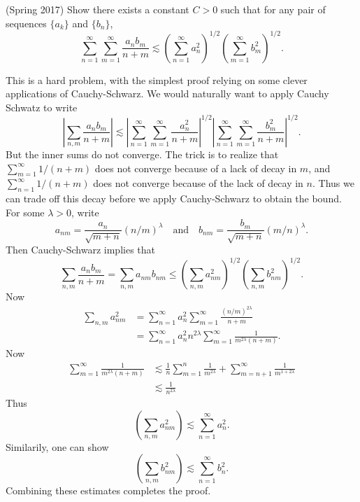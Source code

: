 \documentclass[answers]{exam}
\begin{document}
\begin{questions}
\question (Spring 2017) Show there exists a constant $C > 0$ such that for any pair of sequences $\{ a_k \}$ and $\{ b_n \}$,
%
\[ \sum_{n = 1}^\infty \sum_{m = 1}^\infty \frac{a_n b_m}{n + m} \lesssim \left( \sum_{n = 1}^\infty a_n^2 \right)^{1/2} \left( \sum_{m = 1}^\infty b_m^2 \right)^{1/2}. \]
\begin{solution}
	This is a hard problem, with the simplest proof relying on some clever applications of Cauchy-Schwarz. We would naturally want to apply Cauchy Schwatz to write
	\[ \left| \sum_{n,m} \frac{a_n b_m}{n + m} \right| \lesssim \left| \sum_{n = 1}^\infty \sum_{m = 1}^\infty \frac{a_n^2}{n + m} \right|^{1/2} \left| \sum_{n = 1}^\infty \sum_{m = 1}^\infty \frac{b_m^2}{n + m} \right|^{1/2}. \]
	But the inner sums do not converge. The trick is to realize that $\sum_{m = 1}^\infty 1/(n+m)$ does not converge because of a lack of decay in $m$, and $\sum_{n = 1}^\infty 1/(n+m)$ does not converge because of the lack of decay in $n$. Thus we can trade off this decay before we apply Cauchy-Schwarz to obtain the bound. For some $\lambda > 0$, write
	\[ a_{nm} = \frac{a_n}{\sqrt{m + n}} (n/m)^\lambda \quad\text{and}\quad b_{nm} = \frac{b_m}{\sqrt{m + n}} (m/n)^\lambda. \]
	Then Cauchy-Schwarz implies that
	\[ \sum_{n,m} \frac{a_n b_m}{n + m} = \sum_{n,m} a_{nm} b_{nm} \leq \left( \sum_{n,m} a_{nm}^2 \right)^{1/2} \left( \sum_{n,m} b_{nm}^2 \right)^{1/2}. \]
	Now
	\begin{align*}
		\sum_{n,m} a_{nm}^2 &= \sum_{n = 1}^\infty a_n^2 \sum_{m = 1}^\infty \frac{(n/m)^{2\lambda}}{n + m}\\
		&= \sum_{n = 1}^\infty a_n^2 n^{2\lambda} \sum_{m = 1}^\infty \frac{1}{m^{2\lambda} (n + m)}. 
	\end{align*}
	Now
	\begin{align*}
		\sum_{m = 1}^\infty \frac{1}{m^{2\lambda} (n + m)} &\lesssim \frac{1}{n} \sum_{m = 1}^n \frac{1}{m^{2\lambda}} + \sum_{m = n+1}^\infty \frac{1}{m^{1 + 2\lambda}}\\
		&\lesssim \frac{1}{n^{2\lambda}}
	\end{align*}
	Thus
	\[ \left( \sum_{n,m} a_{nm}^2 \right) \lesssim \sum_{n = 1}^\infty a_n^2. \]
	Similarily, one can show
	\[ \left( \sum_{n,m} b_{nm}^2 \right) \lesssim \sum_{n = 1}^\infty b_n^2. \]
	Combining these estimates completes the proof.


\end{solution}
\end{questions}
\end{document}
